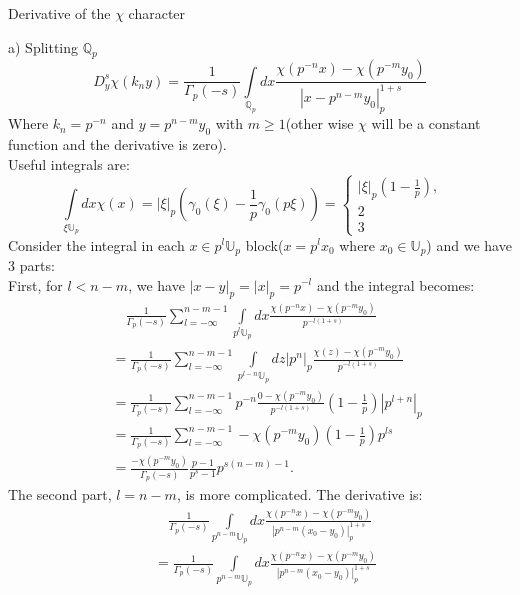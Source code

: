 \documentclass[12pt]{article}
\begin{document}
\begin{section}{Derivative of the $\chi$ character}
\begin{paragraph}{a) Splitting $\mathbb{Q}_p$}
\begin{equation}
D^s_y \chi(k_n y)=\frac{1}{\Gamma_p (-s)} \int\limits _{\mathbb{Q}_p}dx \frac{\chi( p^{-n} x) - \chi( p^{-m}y_0)}{|x-p^{n-m}y_0|_p^{1+s}}
\end{equation}
Where $k_n=p^{-n}$ and $y=p^{n-m} y_0$ with $m\geq 1$(other wise $\chi$ will be a constant function and the derivative is zero).\\
Useful integrals are:
\begin{equation}
\int\limits_{\xi \mathbb{U}_p}dx\chi(x)=|\xi|_p(\gamma_0(\xi)-\frac{1}{p}\gamma_0(p\xi))
=\begin{cases}
|\xi|_p(1-\frac{1}{p}),\quad \\
2\\
3
\end{cases}
\end{equation}
Consider the integral in each $x\in p^l \mathbb{U}_p$ block($x=p^l x_0$ where $x_0\in \mathbb{U}_p$) and we have 3 parts:\\
First, for $l<n-m$, we have $|x-y|_p=|x|_p=p^{-l}$ and the integral becomes:
\begin{equation}
\begin{split}
&\quad\frac{1}{\Gamma_p(-s)}\sum_{l=-\infty}^{n-m-1} \int\limits _{p^l \mathbb{U}_p}dx \frac{\chi( p^{-n} x) - \chi( p^{-m}y_0)}{p^{-l(1+s)}}\\\
&= \frac{1}{\Gamma_p(-s)}\sum_{l=-\infty}^{n-m-1} \int\limits _{p^{l-n} \mathbb{U}_p}dz |p^n|_p \frac{\chi(z) - \chi( p^{-m}y_0)}{p^{-l(1+s)}} \\
&= \frac{1}{\Gamma_p(-s)}\sum_{l=-\infty}^{n-m-1} p^{-n} \frac{0 - \chi( p^{-m}y_0)}{p^{-l(1+s)}} (1-\frac{1}{p}) |p^{l+n}|_p \\
&= \frac{1}{\Gamma_p(-s)}\sum_{l=-\infty}^{n-m-1} - \chi( p^{-m}y_0)(1-\frac{1}{p})p^{ls}\\
&= \frac{- \chi( p^{-m}y_0)}{\Gamma_p(-s)} \frac{p-1}{p^s-1} p^{s(n-m)-1}.
\end{split}
\end{equation}
The second part, $l=n-m$, is more complicated. The derivative is:
\begin{equation}
\begin{split}
&\quad\frac{1}{\Gamma_p (-s)} \int\limits _{p^{n-m}\mathbb{U}_p}dx\frac{\chi( p^{-n} x) - \chi( p^{-m}y_0)}{|p^{n-m}(x_0-y_0)|_p^{1+s}}\\
&=\frac{1}{\Gamma_p (-s)} \int\limits _{p^{n-m}\mathbb{U}_p}dx\frac{\chi( p^{-n} x) - \chi( p^{-m}y_0)}{|p^{n-m}(x_0-y_0)|_p^{1+s}}
\end{split}

\end{equation}
\end{paragraph}
\end{section}
\end{document}
